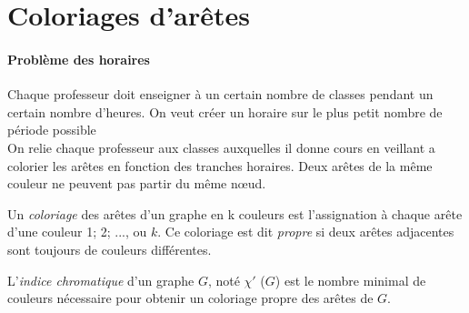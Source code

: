 \section{Coloriages d'arêtes}

\paragraph{Problème des horaires}
Chaque professeur doit enseigner à un certain nombre de classes pendant un certain nombre d'heures. On veut créer
un horaire sur le plus petit nombre de période possible
\\On relie chaque professeur aux classes auxquelles il donne cours en veillant a colorier les arêtes en fonction des tranches horaires. Deux arêtes de la même couleur ne peuvent pas partir du même nœud.

\begin{mydef}
  Un \emph{coloriage} des arêtes d’un graphe en k couleurs est l’assignation à chaque arête d’une couleur 1; 2; ..., ou $k$. Ce coloriage est dit \emph{propre} si deux arêtes adjacentes sont toujours de couleurs différentes.
\end{mydef}

\begin{mydef}
  L’\emph{indice chromatique} d’un graphe $G$, noté $\chi '$ ($G$) est le nombre minimal de couleurs nécessaire pour obtenir un coloriage propre des arêtes de $G$.
\end{mydef}


